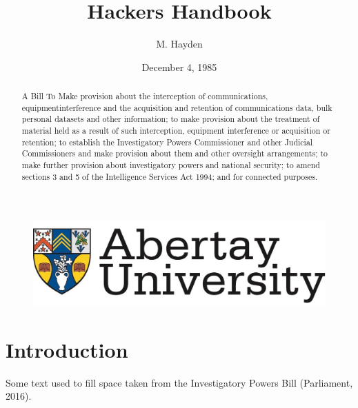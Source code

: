 \documentclass[12pt,a4paper]{article}
\title{Hackers Handbook}
\author{M. Hayden}
\affil{BSc Ethical Hacking\\
		Abertay University\\
		Dundee, United Kingdom\\
		StudentNumber@abertay.ac.uk}
\date{December 4, 1985}
\begin{document}

	\begin{figure}
		\includegraphics[width=\linewidth]{img/Unilogo}
	\end{figure}

	\maketitle

	\newpage				
		\begin{abstract}
		 A Bill To Make provision about the interception of communications, equipmentinterference and the acquisition and retention of communications data, bulk personal datasets and other information; to make provision about the treatment of material held as a result of such interception, equipment interference or acquisition or retention; to establish the Investigatory Powers Commissioner and other Judicial Commissioners and make provision about them and other oversight arrangements; to make further provision about investigatory powers and national security; to amend sections 3 and 5 of the Intelligence Services Act 1994; and for connected purposes.			
			
		\end{abstract}

	\newpage
	\tableofcontents
	\newpage
				
		

	\section{Introduction}
		 Some text used to fill space taken from the Investigatory Powers Bill (Parliament, 2016).
		
\end{document}
